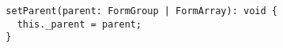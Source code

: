 \begin{verbatim}
  setParent(parent: FormGroup | FormArray): void {
    this._parent = parent;
  }
\end{verbatim}
